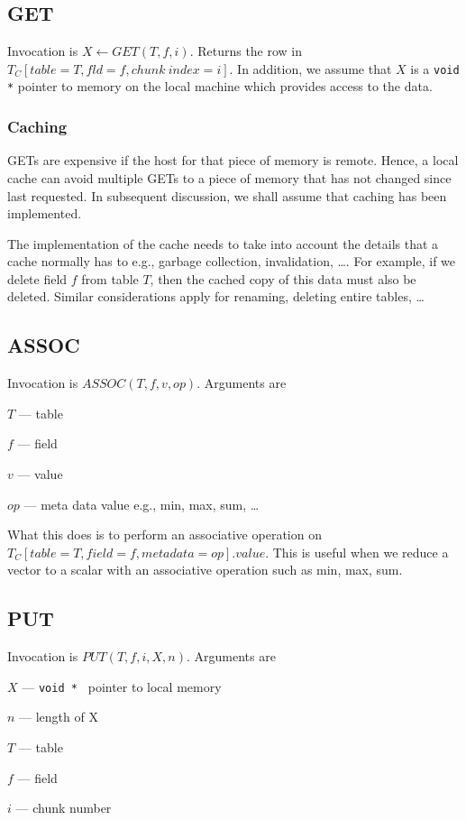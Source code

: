 \subsection{GET}

Invocation is \(X \leftarrow GET(T, f, i) \). Returns the row in 
\(T_C[table=T, fld=f, chunk~index =i]\). In addition, we assume that
\(X\) is a \verb+void *+ pointer to memory on the local machine which
provides access to the data.

\subsubsection{Caching}

GETs are expensive if the host for that piece of memory is remote.
Hence, a local cache can avoid multiple GETs to a piece of memory that
has not changed since last requested. In subsequent discussion, we shall
assume that caching has been implemented. 

The implementation of the cache needs to take into account the details
that a cache normally has to e.g., garbage collection, invalidation,
\ldots. For example, if we delete field \(f\) from table \(T\), then the
cached copy of this data must also be deleted. Similar considerations
apply for renaming, deleting entire tables, \ldots

\subsection{ASSOC}

Invocation is \(ASSOC(T, f, v, op) \). 
Arguments are
\be
\item \(T\) --- table
\item \(f\) --- field
\item \(v\) --- value
\item \(op\) --- meta data value e.g., min, max, sum, \ldots
\ee

What this does is to perform an associative operation on
\(T_C[table=T,field=f, metadata=op].value\). This is useful when
we reduce a vector to a scalar with an associative operation such as
min, max, sum. 

\subsection{PUT}

Invocation is \(PUT(T, f, i, X, n) \). 
Arguments are
\be
\item \(X\) --- \verb+void * + pointer to local memory
\item \(n\) --- length of X
\item \(T\) --- table
\item \(f\) --- field
\item \(i\) --- chunk number
\ee

